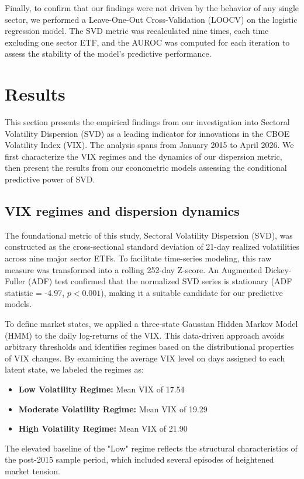 \documentclass[]{article}
\begin{document}
Finally, to confirm that our findings were not driven by the behavior of any single sector, we performed a Leave-One-Out Cross-Validation (LOOCV) on the logistic regression model. The SVD metric was recalculated nine times, each time excluding one sector ETF, and the AUROC was computed for each iteration to assess the stability of the model's predictive performance.

\section{Results}
\label{sec:results}
This section presents the empirical findings from our investigation into Sectoral Volatility Dispersion (SVD) as a leading indicator for innovations in the CBOE Volatility Index (VIX). The analysis spans from January 2015 to April 2026. We first characterize the VIX regimes and the dynamics of our dispersion metric, then present the results from our econometric models assessing the conditional predictive power of SVD.

\subsection{VIX regimes and dispersion dynamics}
The foundational metric of this study, Sectoral Volatility Dispersion (SVD), was constructed as the cross-sectional standard deviation of 21-day realized volatilities across nine major sector ETFs. To facilitate time-series modeling, this raw measure was transformed into a rolling 252-day Z-score. An Augmented Dickey-Fuller (ADF) test confirmed that the normalized SVD series is stationary (ADF statistic = -4.97, $p < 0.001$), making it a suitable candidate for our predictive models.

To define market states, we applied a three-state Gaussian Hidden Markov Model (HMM) to the daily log-returns of the VIX. This data-driven approach avoids arbitrary thresholds and identifies regimes based on the distributional properties of VIX changes. By examining the average VIX level on days assigned to each latent state, we labeled the regimes as:
\begin{itemize}
    \item \textbf{Low Volatility Regime:} Mean VIX of 17.54
    \item \textbf{Moderate Volatility Regime:} Mean VIX of 19.29
    \item \textbf{High Volatility Regime:} Mean VIX of 21.90
\end{itemize}
The elevated baseline of the "Low" regime reflects the structural characteristics of the post-2015 sample period, which included several episodes of heightened market tension.
\end{document}

